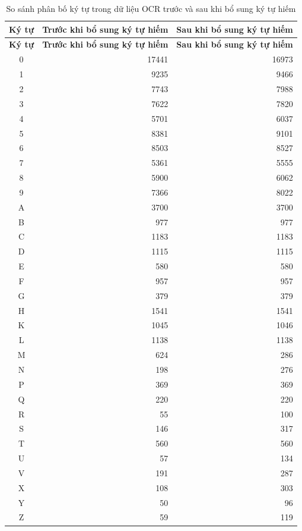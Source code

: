 \documentclass[13pt,a4paper]{report}
\begin{document}
\begin{longtable}{|c|r|r|}
	\caption{So sánh phân bố ký tự trong dữ liệu OCR trước và sau khi bổ sung ký tự hiếm}
	\label{tab:char_count_compare_all} \\
	\hline
	\textbf{Ký tự} 
	& \textbf{Trước khi bổ sung ký tự hiếm} 
	& \textbf{Sau khi bổ sung ký tự hiếm} \\
	\hline
	\endfirsthead
	
	\hline
	\textbf{Ký tự} 
	& \textbf{Trước khi bổ sung ký tự hiếm} 
	& \textbf{Sau khi bổ sung ký tự hiếm} \\
	\hline
	\endhead
	
	0 & 17441 & 16973 \\
	\hline
	1 & 9235 & 9466 \\
	\hline
	2 & 7743 & 7988 \\
	\hline
	3 & 7622 & 7820 \\
	\hline
	4 & 5701 & 6037 \\
	\hline
	5 & 8381 & 9101 \\
	\hline
	6 & 8503 & 8527 \\
	\hline
	7 & 5361 & 5555 \\
	\hline
	8 & 5900 & 6062 \\
	\hline
	9 & 7366 & 8022 \\
	\hline
	A & 3700 & 3700 \\
	\hline
	B & 977 & 977 \\
	\hline
	C & 1183 & 1183 \\
	\hline
	D & 1115 & 1115 \\
	\hline
	E & 580 & 580 \\
	\hline
	F & 957 & 957 \\
	\hline
	G & 379 & 379 \\
	\hline
	H & 1541 & 1541 \\
	\hline
	K & 1045 & 1046 \\
	\hline
	L & 1138 & 1138 \\
	\hline
	M & 624 & 286 \\
	\hline
	N & 198 & 276 \\
	\hline
	P & 369 & 369 \\
	\hline
	Q & 220 & 220 \\
	\hline
	R & 55 & 100 \\
	\hline
	S & 146 & 317 \\
	\hline
	T & 560 & 560 \\
	\hline
	U & 57 & 134 \\
	\hline
	V & 191 & 287 \\
	\hline
	X & 108 & 303 \\
	\hline
	Y & 50 & 96 \\
	\hline
	Z & 59 & 119 \\
	\hline

	
\end{longtable}
\end{document}
